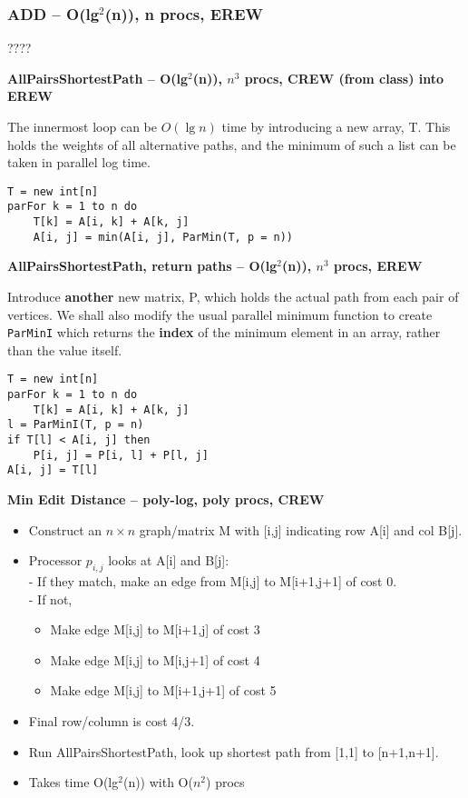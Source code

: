 \documentclass[12pt]{article}
\providecommand{\tightlist}{
    \setlength{\itemsep}{0pt}\setlength{\parskip}{0pt}
}
\begin{document}
\subsubsection*{ADD -- O(lg$^2$(n)), n procs, EREW}
????


\begin{centering}\textbf{AllPairsShortestPath -- O(lg$^2$(n)), $n^3$ procs, CREW (from class) into EREW}\par\end{centering}
The innermost loop can be $O(\lg n)$ time by introducing a new array, T.
This holds the weights of all alternative paths, and the minimum of such a list can be taken in parallel log time.
\begin{lstlisting}
T = new int[n]
parFor k = 1 to n do
    T[k] = A[i, k] + A[k, j]
    A[i, j] = min(A[i, j], ParMin(T, p = n))
\end{lstlisting}

\begin{centering}\textbf{AllPairsShortestPath, return paths -- O(lg$^2$(n)), $n^3$ procs, EREW}\par\end{centering}
Introduce \textbf{another} new matrix, P, which holds the actual path from each pair of vertices.
We shall also modify the usual parallel minimum function to create \texttt{ParMinI} which returns the \textbf{index} of the minimum element in an array, rather than the value itself.
\begin{lstlisting}
T = new int[n]
parFor k = 1 to n do
    T[k] = A[i, k] + A[k, j]
l = ParMinI(T, p = n)
if T[l] < A[i, j] then
    P[i, j] = P[i, l] + P[l, j]
A[i, j] = T[l]
\end{lstlisting}


\begin{centering}\textbf{Min Edit Distance -- poly-log, poly procs, CREW}\par\end{centering}
\begin{itemize}\tightlist
  \item Construct an $n\times n$ graph/matrix M with [i,j] indicating row A[i] and col B[j].
  \item Processor $p_{i,j}$ looks at A[i] and B[j]:\\
    -  If they match, make an edge from M[i,j] to M[i+1,j+1] of cost 0.\\
    -  If not,
    \begin{itemize}\tightlist
      \item Make edge M[i,j] to M[i+1,j] of cost 3
      \item Make edge M[i,j] to M[i,j+1] of cost 4
      \item Make edge M[i,j] to M[i+1,j+1] of cost 5
    \end{itemize}
  \item Final row/column is cost 4/3.
  \item Run AllPairsShortestPath, look up shortest path from [1,1] to [n+1,n+1].
  \item Takes time O(lg$^2$(n)) with O($n^2$) procs
\end{itemize}
\end{document}
